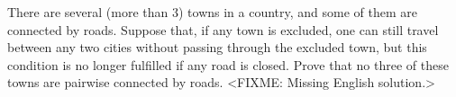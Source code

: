 \problem
There are several (more than 3) towns in a country, and some of them are
connected by roads.
Suppose that, if any town is excluded, one can still travel between any two
cities without passing through the excluded town, but this condition is no
longer fulfilled if any road is closed.
Prove that no three of these towns are pairwise connected by roads.
\solution
<FIXME: Missing English solution.>
\endproblem
